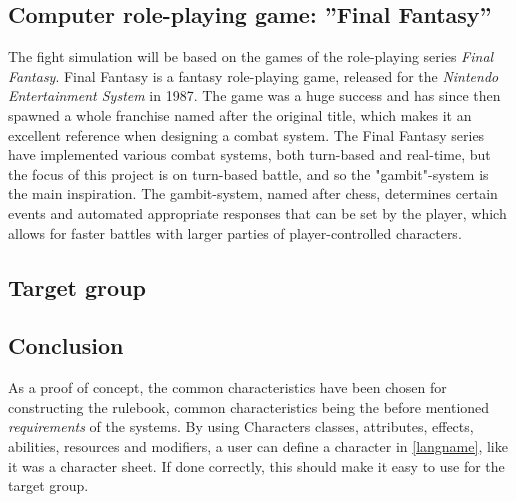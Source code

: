 
\subsection*{Computer role-playing game: ''Final Fantasy''}
The fight simulation will be based on the games of the role-playing series \emph{Final Fantasy}. Final Fantasy is a fantasy role-playing game, released for the \emph{Nintendo Entertainment System} in 1987. The game was a huge success and has since then spawned a whole franchise named after the original title, which makes it an excellent reference when designing a combat system.
The Final Fantasy series have implemented various combat systems, both turn-based and real-time,\cite{ffantasy} but the focus of this project is on turn-based battle, and so the "gambit"-system is the main inspiration. The gambit-system, named after chess, determines certain events and automated appropriate responses that can be set by the player, which allows for faster battles with larger parties of player-controlled characters.

\subsection*{Target group}

\subsection{Conclusion}
As a proof of concept, the common characteristics have been chosen for constructing the rulebook, common characteristics being the before mentioned \emph{requirements} of the systems.
By using Characters classes, attributes, effects, abilities, resources and modifiers, a user can define a character in \ref{langname}, like it was a character sheet. If done correctly, this should make it easy to use for the target group.



